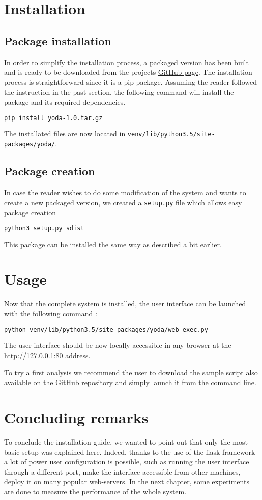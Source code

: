 \section{Installation}
\subsection{Package installation}
In order to simplify the installation process, a packaged version has been built and is ready to be downloaded from the projects \href{https://github.com/dchenaux/Yoda}{GitHub page}. The installation process is straightforward since it is a \gls{pip} package. Assuming the reader followed the instruction in the past section, the following command will install the package and its required dependencies. 
\smallskip
\begin{lstlisting}[language=bash]
pip install yoda-1.0.tar.gz
\end{lstlisting}

The installated files are now located in \texttt{venv/lib/python3.5/site-packages/yoda/}.

\subsection{Package creation}
In case the reader wishes to do some modification of the system and wants to create a new packaged version, we created a \texttt{setup.py} file which allows easy package creation
\smallskip
\begin{lstlisting}[language=bash]
python3 setup.py sdist
\end{lstlisting}

This package can be installed the same way as described a bit earlier.

\section{Usage}
Now that the complete system is installed, the user interface can be launched with the following command :
\smallskip
\begin{lstlisting}[language=bash]
python venv/lib/python3.5/site-packages/yoda/web_exec.py
\end{lstlisting}
The user interface should be now locally accessible in any browser at the \url{http://127.0.0.1:80} address.

To try a first analysis we recommend the user to download the sample script also available on the GitHub repository and simply launch it from the command line.

\section{Concluding remarks}
To conclude the installation guide, we wanted to point out that only the most basic setup was explained here. Indeed, thanks to the use of the flask framework a lot of power user configuration is possible, such as running the user interface through a different port, make the interface accessible from other machines, deploy it on many popular web-servers. In the next chapter, some experiments are done to measure the performance of the whole system.
